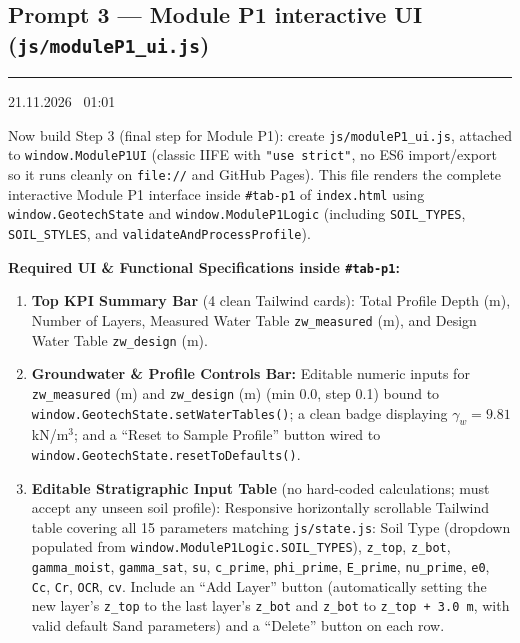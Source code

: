 \documentclass[11pt,a4paper]{article}
\newcommand{\stamp}[1]{{\small\bfseries\color{black!70}\textcolor{accent}{\rule[-2pt]{2pt}{10pt}}\hspace{6pt}#1}\par}
\newcommand{\code}[1]{\texttt{\small #1}}
\begin{document}
\subsection{Prompt 3 --- Module P1 interactive UI (\code{js/moduleP1\_ui.js})}
\stamp{21.11.2026 \textbar\ 01:01}
\begin{prompt}
Now build Step 3 (final step for Module P1): create \code{js/moduleP1\_ui.js}, attached to \code{window.ModuleP1UI}
(classic IIFE with \code{"use strict"}, no ES6 import/export so it runs cleanly on \code{file://} and GitHub Pages).
This file renders the complete interactive Module P1 interface inside \code{\#tab-p1} of \code{index.html} using
\code{window.GeotechState} and \code{window.ModuleP1Logic} (including \code{SOIL\_TYPES}, \code{SOIL\_STYLES}, and
\code{validateAndProcessProfile}).

\textbf{Required UI \& Functional Specifications inside \code{\#tab-p1}:}
\begin{enumerate}
\item \textbf{Top KPI Summary Bar} (4 clean Tailwind cards): Total Profile Depth (m), Number of Layers, Measured Water
  Table \code{zw\_measured} (m), and Design Water Table \code{zw\_design} (m).
\item \textbf{Groundwater \& Profile Controls Bar:} Editable numeric inputs for \code{zw\_measured} (m) and
  \code{zw\_design} (m) (min 0.0, step 0.1) bound to \code{window.GeotechState.setWaterTables()}; a clean badge
  displaying $\gamma_w = 9.81$ kN/m$^3$; and a ``Reset to Sample Profile'' button wired to
  \code{window.GeotechState.resetToDefaults()}.
\item \textbf{Editable Stratigraphic Input Table} (no hard-coded calculations; must accept any unseen soil profile):
  Responsive horizontally scrollable Tailwind table covering all 15 parameters matching \code{js/state.js}: Soil Type
  (dropdown populated from \code{window.ModuleP1Logic.SOIL\_TYPES}), \code{z\_top}, \code{z\_bot},
  \code{gamma\_moist}, \code{gamma\_sat}, \code{su}, \code{c\_prime}, \code{phi\_prime}, \code{E\_prime},
  \code{nu\_prime}, \code{e0}, \code{Cc}, \code{Cr}, \code{OCR}, \code{cv}. Include an ``Add Layer'' button
  (automatically setting the new layer's \code{z\_top} to the last layer's \code{z\_bot} and \code{z\_bot} to
  \code{z\_top + 3.0 m}, with valid default Sand parameters) and a ``Delete'' button on each row.


\end{enumerate}
\end{prompt}
\end{document}
